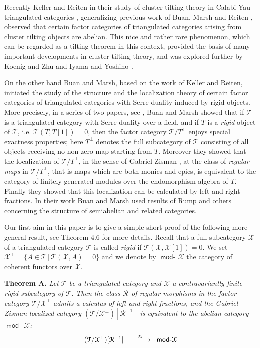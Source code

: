 \documentclass[oneside, a4paper,reqno]{amsart}
\numberwithin{equation}{section}
\theoremstyle{definition}
\begin{document}
  Recently Keller and Reiten  in their study of cluster tilting theory in Calabi-Yau triangulated categories \cite{KR1}, generalizing previous work of Buan, Marsh and Reiten \cite{BRM}, observed that certain factor categories of triangulated categories arising from cluster tilting objects are abelian. This nice and rather rare phenomenon, which can be regarded as a tilting theorem in this context, provided the basis of many important developments in cluster tilting theory, and  was explored further by Koenig and Zhu \cite{KZ} and Iyama and Yoshino \cite{IY}.
 
 
 On the other hand Buan and Marsh, based on the work of Keller and Reiten, initiated the study of the structure and the localization theory of certain factor categories of triangulated categories with  Serre duality induced by rigid objects.     
 More precisely, in a series of two papers, see \cite{BM1, BM2}, Buan and Marsh showed that if ${\mathcal T}$ is a triangulated category with Serre duality over a field, and if $T$ is a {\em rigid} object of ${\mathcal T}$, i.e.  ${\mathcal T}(T,T[1]) = 0$, then the factor category ${\mathcal T}/T^{\bot}$ enjoys special exactness properties; here $T^{\bot}$ denotes the full subcategory of ${\mathcal T}$ consisting of all objects receiving no non-zero map starting from $T$.    Moreover they showed that the localization of ${\mathcal T}/T^{\bot}$, in the sense of Gabriel-Zisman \cite{GZ}, at the class of {\em regular maps} in ${\mathcal T}/T^{\bot}$, that is maps which are both monics and epics, is equivalent to the category of finitely generated modules over the endomorphism algebra of $T$. Finally they showed that this localization can be calculated by left and right fractions.  In their work Buan and Marsh used  results of Rump \cite{Rump} and others concerning the structure of semiabelian and related categories.   
 
 Our first aim in this paper is to give a simple short proof of the following more general result, see Theorem $4.6$ for more details. Recall that a full subcategory ${\mathcal X}$ of a triangulated category ${\mathcal T}$ is called {\em rigid} if ${\mathcal T}({\mathcal X},{\mathcal X}[1]) = 0$. We set ${\mathcal X}^{\bot} = \{A \in {\mathcal T} \, | \, {\mathcal T}({\mathcal X},A) = 0\}$ and we denote by $\operatorname*{\mathsf{mod}-\!}{\mathcal X}$ the category of coherent functors over ${\mathcal X}$. 
 
 \medskip
 
 {\bf Theorem A.} {\em Let ${\mathcal T}$ be a triangulated category and ${\mathcal X}$ a contravariantly finite rigid subcategory of ${\mathcal T}$. Then the class $\mathcal R$ of regular morphisms in the factor category ${\mathcal T}/{\mathcal X}^{\bot}$ admits a calculus of left and right fractions, and the Gabriel-Zisman localized category $({\mathcal T}/{\mathcal X}^{\bot})[\mathcal R^{-1}]$ is equivalent to the abelian category $\operatorname*{\mathsf{mod}-\!}{\mathcal X}$:}
 \[
 \begin{CD}
  ({\mathcal T}/{\mathcal X}^{\bot})[\mathcal R^{-1}] \,\, @> \approx >> \,\, \operatorname*{\mathsf{mod}-\!}{\mathcal X} 
 \end{CD}
 \] 
\end{document}
